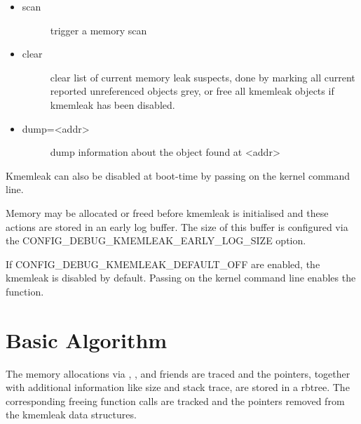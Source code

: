 \documentclass[a4paper,8pt,english]{sphinxmanual}
\begin{document}
\begin{itemize}
\begin{description}
\end{description}

\item {} \begin{description}
\item[{scan}] \leavevmode
trigger a memory scan

\end{description}

\item {} \begin{description}
\item[{clear}] \leavevmode
clear list of current memory leak suspects, done by
marking all current reported unreferenced objects grey,
or free all kmemleak objects if kmemleak has been disabled.

\end{description}

\item {} \begin{description}
\item[{dump=\textless{}addr\textgreater{}}] \leavevmode
dump information about the object found at \textless{}addr\textgreater{}

\end{description}

\end{itemize}

Kmemleak can also be disabled at boot-time by passing  on
the kernel command line.

Memory may be allocated or freed before kmemleak is initialised and
these actions are stored in an early log buffer. The size of this buffer
is configured via the CONFIG\_DEBUG\_KMEMLEAK\_EARLY\_LOG\_SIZE option.

If CONFIG\_DEBUG\_KMEMLEAK\_DEFAULT\_OFF are enabled, the kmemleak is
disabled by default. Passing  on the kernel command
line enables the function.


\section{Basic Algorithm}
\label{dev-tools/kmemleak:basic-algorithm}
The memory allocations via , ,
 and
friends are traced and the pointers, together with additional
information like size and stack trace, are stored in a rbtree.
The corresponding freeing function calls are tracked and the pointers
removed from the kmemleak data structures.
\end{document}
